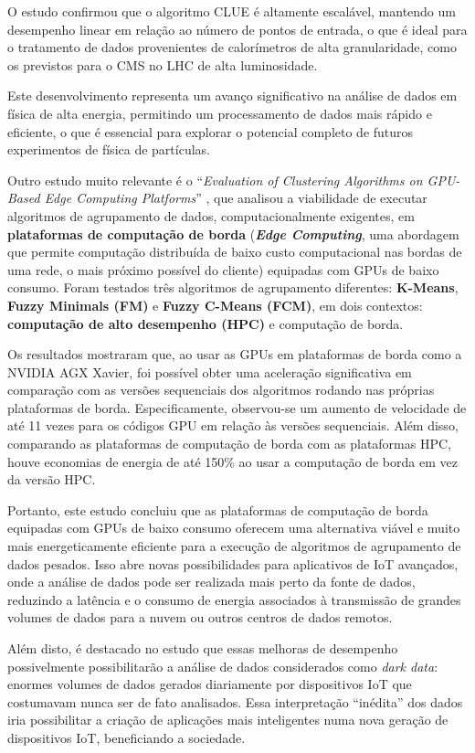 \documentclass[12pt,
openright, 
oneside, %
a4paper,    %
brazil]{facom-ufu-abntex2}
\begin{document}
O estudo confirmou que o algoritmo CLUE é altamente escalável, mantendo um desempenho linear em relação ao número de pontos de entrada, o que é ideal para o tratamento de dados provenientes de calorímetros de alta granularidade, como os previstos para o CMS no LHC de alta luminosidade.

Este desenvolvimento representa um avanço significativo na análise de dados em física de alta energia, permitindo um processamento de dados mais rápido e eficiente, o que é essencial para explorar o potencial completo de futuros experimentos de física de partículas.

Outro estudo muito relevante é o \enquote{\textit{Evaluation of Clustering Algorithms on GPU-Based Edge Computing Platforms}} \cite{edgeComputingGPUsIOT2020}, que analisou a viabilidade de executar algoritmos de agrupamento de dados, computacionalmente exigentes, em \textbf{plataformas de computação de borda} (\textbf{\textit{Edge Computing}}, uma abordagem que permite computação distribuída de baixo custo computacional nas bordas de uma rede, o mais próximo possível do cliente) equipadas com GPUs de baixo consumo. Foram testados três algoritmos de agrupamento diferentes: \textbf{K-Means}, \textbf{Fuzzy Minimals (FM)} e \textbf{Fuzzy C-Means (FCM)}, em dois contextos: \textbf{computação de alto desempenho (HPC)} e computação de borda.

Os resultados mostraram que, ao usar as GPUs em plataformas de borda como a NVIDIA AGX Xavier, foi possível obter uma aceleração significativa em comparação com as versões sequenciais dos algoritmos rodando nas próprias plataformas de borda. Especificamente, observou-se um aumento de velocidade de até 11 vezes para os códigos GPU em relação às versões sequenciais. Além disso, comparando as plataformas de computação de borda com as plataformas HPC, houve economias de energia de até 150\% ao usar a computação de borda em vez da versão HPC.

Portanto, este estudo concluiu que as plataformas de computação de borda equipadas com GPUs de baixo consumo oferecem uma alternativa viável e muito mais energeticamente eficiente para a execução de algoritmos de agrupamento de dados pesados. Isso abre novas possibilidades para aplicativos de IoT avançados, onde a análise de dados pode ser realizada mais perto da fonte de dados, reduzindo a latência e o consumo de energia associados à transmissão de grandes volumes de dados para a nuvem ou outros centros de dados remotos.

Além disto, é destacado no estudo que essas melhoras de desempenho possivelmente possibilitarão a análise de dados considerados como \textit{dark data}: enormes volumes de dados gerados diariamente por dispositivos IoT que costumavam nunca ser de fato analisados. Essa interpretação \enquote{inédita} dos dados iria possibilitar a criação de aplicações mais inteligentes numa nova geração de dispositivos IoT, beneficiando a sociedade.
\end{document}
